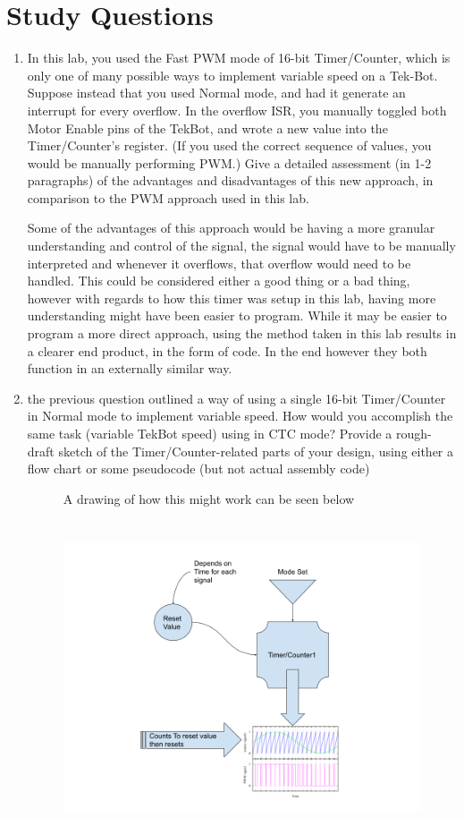 \documentclass[12pt,letterpaper]{article}
\begin{document}
\section{Study Questions}
\begin{enumerate}
    \item
    In this lab, you used the Fast PWM mode of 16-bit Timer/Counter, which is only one of many possible ways to implement variable speed on a Tek-Bot. Suppose instead that you used Normal mode, and had it generate an interrupt for every overflow. In the overflow ISR, you manually toggled both Motor Enable pins of the TekBot, and wrote a new value into the Timer/Counter’s register. (If you used the correct sequence of values, you would be manually performing PWM.) Give a detailed assessment (in 1-2 paragraphs) of the advantages and disadvantages of this new approach, in comparison to the PWM approach used in this lab.
    
    Some of the advantages of this approach would be having a more granular understanding and control of the signal, the signal would have to be manually interpreted and whenever it overflows, that overflow would need to be handled. This could be considered either a good thing or a bad thing, however with regards to how this timer was setup in this lab, having more understanding might have been easier to program. While it may be easier to program a more direct approach, using the method taken in this lab results in a clearer end product, in the form of code. In the end however they both function in an externally similar way.
    
    
    \item 
    the previous question outlined a way of using a single 16-bit Timer/Counter in Normal mode to implement variable speed. How would you accomplish the same task (variable TekBot speed) using in CTC mode? Provide a rough-draft sketch of the Timer/Counter-related parts of your design, using either a flow chart or some pseudocode (but not actual assembly code)
    
    \begin{figure}[h]
    	 A drawing of how this might work can be seen below
    	\includegraphics[width=12cm, height=10cm]{q2Drawing.png}
    	\centering
    \end{figure}
   

\end{enumerate}
\end{document}
